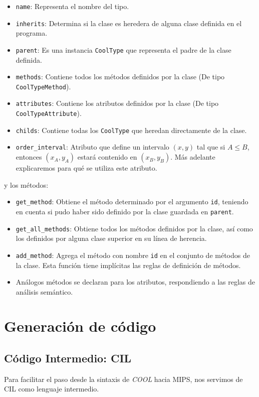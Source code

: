\documentclass[a4paper,10pt,twocolumn]{article}
\begin{document}
\begin{itemize}
	\item \lstinline|name|: Representa el nombre del tipo. 
	\item \lstinline|inherits|: Determina si la clase es heredera de alguna clase definida en el programa. 
	\item \lstinline|parent|: Es una instancia \lstinline|CoolType| que representa el padre de la clase definida. 
	\item \lstinline|methods|: Contiene todos los métodos definidos por la clase (De tipo \lstinline|CoolTypeMethod|). 
	\item \lstinline|attributes|: Contiene los atributos definidos por la clase (De tipo \lstinline|CoolTypeAttribute|).
	\item \lstinline|childs|: Contiene todas los \lstinline|CoolType| que heredan directamente de la clase. 
	\item \lstinline|order_interval|: Atributo que define un intervalo $(x, y)$ tal que si $A\leq B$, entonces $(x_A, y_A)$ estará contenido en $(x_B, y_B)$. Más adelante explicaremos para qué se utiliza este atributo. 
\end{itemize}

y los métodos: 

\begin{itemize}
	\item \lstinline|get_method|: Obtiene el método determinado por el argumento \lstinline|id|, teniendo en cuenta si pudo haber sido definido por la clase guardada en \lstinline|parent|. 
	\item \lstinline|get_all_methods|: Obtiene todos los métodos definidos por la clase, así como los definidos por alguna clase superior en su línea de herencia. 
	\item \lstinline|add_method|: Agrega el método con nombre \lstinline|id| en el conjunto de métodos de la clase. Esta función tiene implícitas las reglas de definición de métodos. 
	
	\item Análogos métodos se declaran para los atributos, respondiendo a las reglas de análisis semántico. 
\end{itemize}

\section{Generación de código}

\subsection{Código Intermedio: CIL}
Para facilitar el paso desde la sintaxis de \textit{COOL} hacia MIPS, nos servimos de CIL como lenguaje intermedio. 
\end{document}
